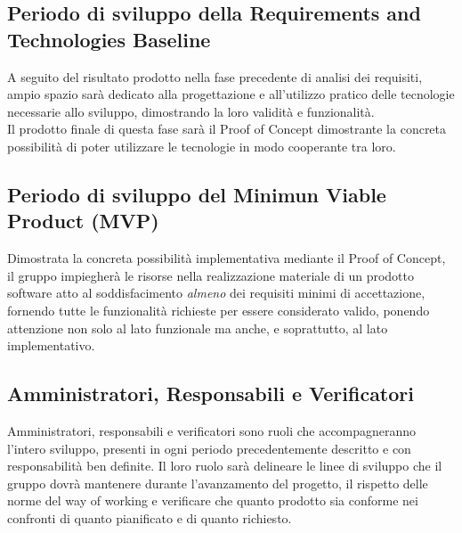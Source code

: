 \documentclass[a4paper, twoside]{article}
\begin{document}
\subsection{Periodo di sviluppo della Requirements and Technologies Baseline}
A seguito del risultato prodotto nella fase precedente di analisi dei requisiti, ampio spazio sarà dedicato alla progettazione e all'utilizzo pratico delle tecnologie necessarie allo sviluppo, dimostrando la loro validità e funzionalità. \\
Il prodotto finale di questa fase sarà il Proof of Concept dimostrante la concreta possibilità di poter utilizzare le tecnologie in modo cooperante tra loro.

\subsection{Periodo di sviluppo del Minimun Viable Product (MVP)}
Dimostrata la concreta possibilità implementativa mediante il Proof of Concept, il gruppo impiegherà le risorse nella realizzazione materiale di un prodotto software atto al soddisfacimento \textit{almeno} dei requisiti minimi di accettazione, fornendo tutte le funzionalità richieste per essere considerato valido, ponendo attenzione non solo al lato funzionale ma anche, e soprattutto, al lato implementativo.

\subsection{Amministratori, Responsabili e Verificatori}
Amministratori, responsabili e verificatori sono ruoli che accompagneranno l'intero sviluppo, presenti in ogni periodo precedentemente descritto e con responsabilità ben definite. Il loro ruolo sarà delineare le linee di sviluppo che il gruppo dovrà mantenere durante l'avanzamento del progetto, il rispetto delle norme del way of working e verificare che quanto prodotto sia conforme nei confronti di quanto pianificato e di quanto richiesto.
\end{document}
